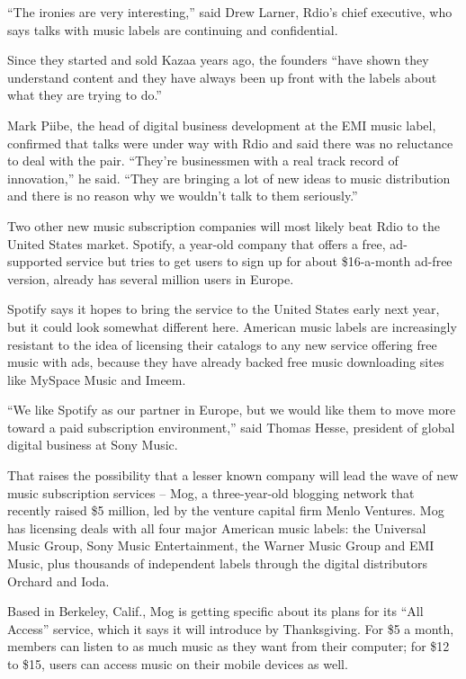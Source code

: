 ﻿\documentclass[12pt]{article}
\begin{document}
``The ironies are very interesting,'' said Drew Larner, Rdio's chief executive, who says talks with
music labels are continuing and confidential.

Since they started and sold Kazaa years ago, the founders ``have shown they understand content and
they have always been up front with the labels about what they are trying to do.''

Mark Piibe, the head of digital business development at the EMI music label, confirmed that talks
were under way with Rdio and said there was no reluctance to deal with the pair. ``They're
businessmen with a real track record of innovation,'' he said. ``They are bringing a lot of new
ideas to music distribution and there is no reason why we wouldn't talk to them seriously.''

Two other new music subscription companies will most likely beat Rdio to the United States market.
Spotify, a year-old company that offers a free, ad-supported service but tries to get users to sign
up for about \$16-a-month ad-free version, already has several million users in Europe.

Spotify says it hopes to bring the service to the United States early next year, but it could look
somewhat different here. American music labels are increasingly resistant to the idea of licensing
their catalogs to any new service offering free music with ads, because they have already backed
free music downloading sites like MySpace Music and Imeem.

``We like Spotify as our partner in Europe, but we would like them to move more toward a paid
subscription environment,'' said Thomas Hesse, president of global digital business at Sony Music.

That raises the possibility that a lesser known company will lead the wave of new music subscription
services -- Mog, a three-year-old blogging network that recently raised \$5 million, led by the
venture capital firm Menlo Ventures. Mog has licensing deals with all four major American music
labels: the Universal Music Group, Sony Music Entertainment, the Warner Music Group and EMI Music,
plus thousands of independent labels through the digital distributors Orchard and Ioda.

Based in Berkeley, Calif., Mog is getting specific about its plans for its ``All Access'' service,
which it says it will introduce by Thanksgiving. For \$5 a month, members can listen to as much
music as they want from their computer; for \$12 to \$15, users can access music on their mobile
devices as well.
\end{document}
